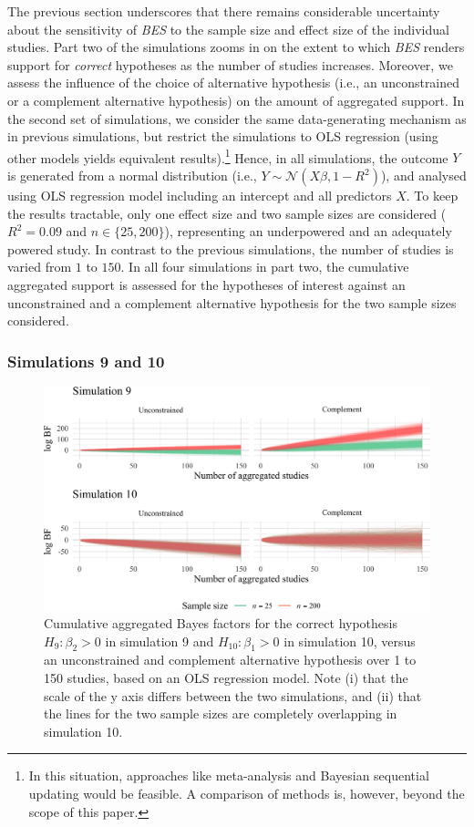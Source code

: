 \documentclass[review, 3p, authoryear]{elsarticle} %
\begin{document}
The previous section underscores that there remains considerable uncertainty about the sensitivity of \emph{BES} to the sample size and effect size of the individual studies.
Part two of the simulations zooms in on the extent to which \emph{BES} renders support for \emph{correct} hypotheses as the number of studies increases.
Moreover, we assess the influence of the choice of alternative hypothesis (i.e., an unconstrained or a complement alternative hypothesis) on the amount of aggregated support.
In the second set of simulations, we consider the same data-generating mechanism as in previous simulations, but restrict the simulations to OLS regression (using other models yields equivalent results).\footnote{
  In this situation, approaches like meta-analysis and Bayesian sequential updating would be feasible. A comparison of methods is, however, beyond the scope of this paper.}
Hence, in all simulations, the outcome \(Y\) is generated from a normal distribution (i.e., \(Y \sim \mathcal{N}(X\beta, 1 - R^2)\)), and analysed using OLS regression model including an intercept and all predictors \(X\).
To keep the results tractable, only one effect size and two sample sizes are considered (\(R^2 = 0.09\) and \(n \in \{25, 200\}\)), representing an underpowered and an adequately powered study.
In contrast to the previous simulations, the number of studies is varied from \(1\) to \(150\).
In all four simulations in part two, the cumulative aggregated support is assessed for the hypotheses of interest against an unconstrained and a complement alternative hypothesis for the two sample sizes considered.

\hypertarget{simulations-9-and-10}{%
\subsubsection{Simulations 9 and 10}\label{simulations-9-and-10}}

\begin{figure}[t]
\includegraphics[width=1\linewidth]{manuscript_volker_files/figure-latex/simBF910-1} \caption{Cumulative aggregated Bayes factors for the correct hypothesis $H_9: \beta_2 > 0$ in simulation 9 and $H_{10}: \beta_1 > 0$ in simulation 10, versus an unconstrained and complement alternative hypothesis over 1 to 150 studies, based on an OLS regression model. Note (i) that the scale of the y axis differs between the two simulations, and (ii) that the lines for the two sample sizes are completely overlapping in simulation 10.}\label{fig:simBF910}
\end{figure}
\end{document}

